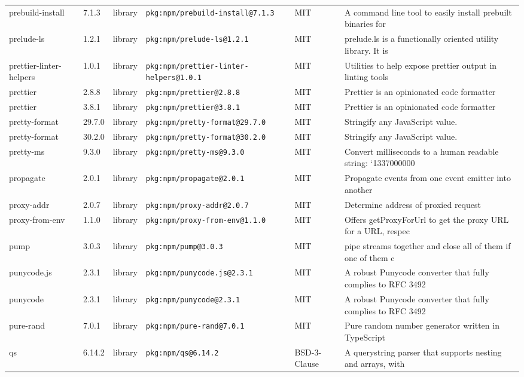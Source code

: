\documentclass[11pt]{article}
\begin{document}
\begin{longtable}{|l|l|l|p{2.2cm}|l|p{4cm}|}
prebuild-install & 7.1.3 & library & \texttt{pkg:npm/prebuild-install@7.1.3} & MIT & A command line tool to easily install prebuilt binaries for  \\
prelude-ls & 1.2.1 & library & \texttt{pkg:npm/prelude-ls@1.2.1} & MIT & prelude.ls is a functionally oriented utility library. It is \\
prettier-linter-helpers & 1.0.1 & library & \texttt{pkg:npm/prettier-linter-helpers@1.0.1} & MIT & Utilities to help expose prettier output in linting tools \\
prettier & 2.8.8 & library & \texttt{pkg:npm/prettier@2.8.8} & MIT & Prettier is an opinionated code formatter \\
prettier & 3.8.1 & library & \texttt{pkg:npm/prettier@3.8.1} & MIT & Prettier is an opinionated code formatter \\
pretty-format & 29.7.0 & library & \texttt{pkg:npm/pretty-format@29.7.0} & MIT & Stringify any JavaScript value. \\
pretty-format & 30.2.0 & library & \texttt{pkg:npm/pretty-format@30.2.0} & MIT & Stringify any JavaScript value. \\
pretty-ms & 9.3.0 & library & \texttt{pkg:npm/pretty-ms@9.3.0} & MIT & Convert milliseconds to a human readable string: `1337000000 \\
propagate & 2.0.1 & library & \texttt{pkg:npm/propagate@2.0.1} & MIT & Propagate events from one event emitter into another \\
proxy-addr & 2.0.7 & library & \texttt{pkg:npm/proxy-addr@2.0.7} & MIT & Determine address of proxied request \\
proxy-from-env & 1.1.0 & library & \texttt{pkg:npm/proxy-from-env@1.1.0} & MIT & Offers getProxyForUrl to get the proxy URL for a URL, respec \\
pump & 3.0.3 & library & \texttt{pkg:npm/pump@3.0.3} & MIT & pipe streams together and close all of them if one of them c \\
punycode.js & 2.3.1 & library & \texttt{pkg:npm/punycode.js@2.3.1} & MIT & A robust Punycode converter that fully complies to RFC 3492  \\
punycode & 2.3.1 & library & \texttt{pkg:npm/punycode@2.3.1} & MIT & A robust Punycode converter that fully complies to RFC 3492  \\
pure-rand & 7.0.1 & library & \texttt{pkg:npm/pure-rand@7.0.1} & MIT &  Pure random number generator written in TypeScript \\
qs & 6.14.2 & library & \texttt{pkg:npm/qs@6.14.2} & BSD-3-Clause & A querystring parser that supports nesting and arrays, with  \\

\end{longtable}
\end{document}
